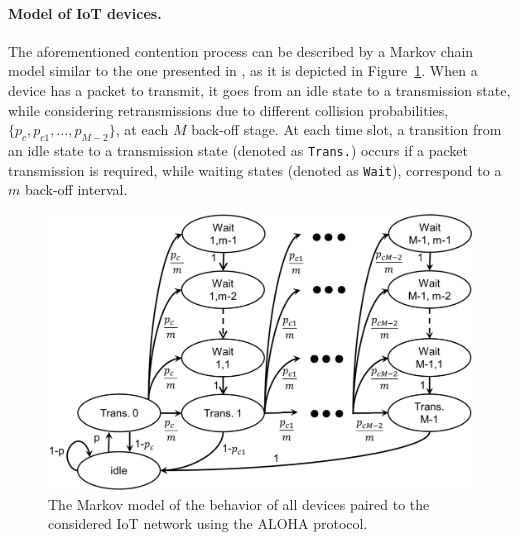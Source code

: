 \paragraph{Model of IoT devices.}

The aforementioned contention process can be described by a Markov chain model \cite{Norris98} similar to the one presented in \cite{Yang12}, as it is depicted in Figure~\ref{fig:43:Markov_model}.
When a device has a packet to transmit, it goes from an idle state to a transmission state, while considering retransmissions due to different collision probabilities, $\{p_{c}, p_{c1}, \dots, p_{M-2} \}$, at each $M$ back-off stage.
At each time slot, a transition from an idle state to a transmission state (denoted as \texttt{Trans.}) occurs if a packet transmission is required, while waiting states (denoted as \texttt{Wait}), correspond to a $m$ back-off interval.

\begin{figure}[!h]
	\centering
	\includegraphics[width=0.70\linewidth]{Markov_model.eps}
	\caption{The Markov model of the behavior of all devices paired to the considered IoT network using the ALOHA protocol.}
	\label{fig:43:Markov_model}
\end{figure}

